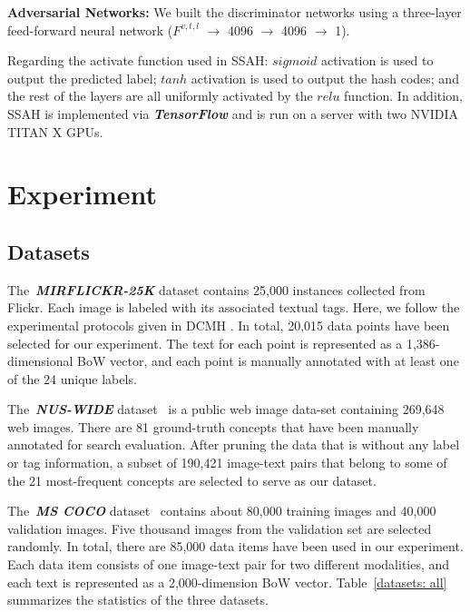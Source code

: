 \documentclass[10pt,twocolumn,letterpaper]{article}
\begin{document}
\textbf{Adversarial Networks:} We built the discriminator networks using a three-layer feed-forward neural network ($F^{v,t,l}$ $\rightarrow$ 4096 $\rightarrow$ 4096 $\rightarrow$ 1).

Regarding the activate function used in SSAH: $sigmoid$ activation is used to output the predicted label; $tanh$ activation is used to output the hash codes; and the rest of the layers are all uniformly activated by the $relu$ function. In addition, SSAH is implemented via \emph\textbf{TensorFlow} and is run on a server with two NVIDIA TITAN X GPUs.

\vspace{-0.3cm}
\section{Experiment}
\vspace{-0.2cm}
\label{section: Experiment}
\subsection{Datasets}
\vspace{-0.15cm}
The~{\emph{\textbf{MIRFLICKR-25K}}} dataset \cite{huiskes2008mir} contains 25,000 instances collected from Flickr. Each image is labeled with its associated textual tags. Here, we follow the experimental protocols given in DCMH \cite{Jiang2017CVPR}. In total, 20,015 data points have been selected for our experiment. The text for each point is represented as a 1,386-dimensional BoW vector, and each point is manually annotated with at least one of the 24 unique labels.

The~\emph{\textbf{NUS-WIDE}} dataset~\cite{chua2009nus} is a public web image data-set containing 269,648 web images. There are 81 ground-truth concepts that have been manually annotated for search evaluation. After pruning the data that is without any label or tag information, a subset of 190,421 image-text pairs that belong to some of the 21 most-frequent concepts are selected to serve as our dataset.

The~\emph{\textbf{MS COCO}} dataset~\cite{lin2014microsoft} contains about 80,000 training images and 40,000 validation images. Five thousand images from the validation set are selected randomly. In total, there are 85,000 data items have been  used in our experiment. Each data item consists of one image-text pair for two different modalities, and each text is represented as a 2,000-dimension BoW vector. Table~\ref{datasets: all} summarizes the statistics of the three datasets.
\vspace{-0.25cm}
\end{document}
